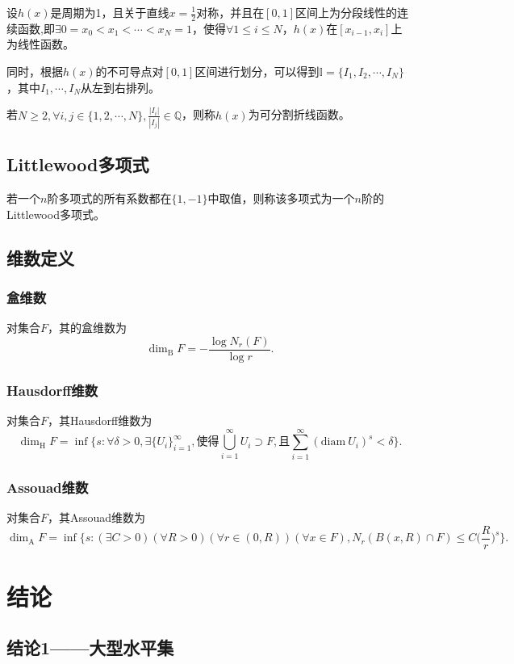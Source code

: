 设$h(x)$是周期为1，且关于直线$x=\frac{1}{2}$对称，并且在$[0,1]$区间上为分段线性的连续函数,即$\exists0=x_0<x_1<\cdots<x_N=1$，使得$\forall 1\le i\le N$，$h(x)$在$[x_{i-1},x_i]$上为线性函数。

同时，根据$h(x)$的不可导点对$[0,1]$区间进行划分，可以得到$\mathbb{I}=\{I_1,I_2,\cdots,I_N\}$，其中$I_1,\cdots,I_N$从左到右排列。

若$N\ge2,\forall i,j\in\{1,2,\cdots,N\},\frac{|I_i|}{|I_j|}\in\mathbb{Q}$，则称$h(x)$为可分割折线函数。

\subsection{Littlewood多项式}
若一个$n$阶多项式的所有系数都在$\{1,-1\}$中取值，则称该多项式为一个$n$阶的Littlewood多项式。

\subsection{维数定义}
\subsubsection{盒维数}
对集合$F$，其的盒维数为
$$
      \mathrm{\dim_B}F=-\frac{\log N_r(F)}{\log r}.
$$

\subsubsection{Hausdorff维数}
对集合$F$，其Hausdorff维数为
$$
      \mathrm{\dim_H}F=\inf\{s:\forall\delta>0,\exists\{U_i\}_{i=1}^\infty,\mbox{使得}\bigcup_{i=1}^\infty U_i\supset F,\mbox{且}\sum_{i=1}^\infty (\mathrm{diam}~U_i)^s<\delta\}.
$$

\subsubsection{Assouad维数}
对集合$F$，其Assouad维数为
$$
      \mathrm{\dim_A}F=\inf\{s:(\exists C>0)(\forall R>0)(\forall r\in(0,R))(\forall x\in F),N_r(B(x,R)\cap F)\le C\Big(\frac{R}{r}\Big)^s\}.
$$

\section{结论}

\subsection{结论1——大型水平集}

